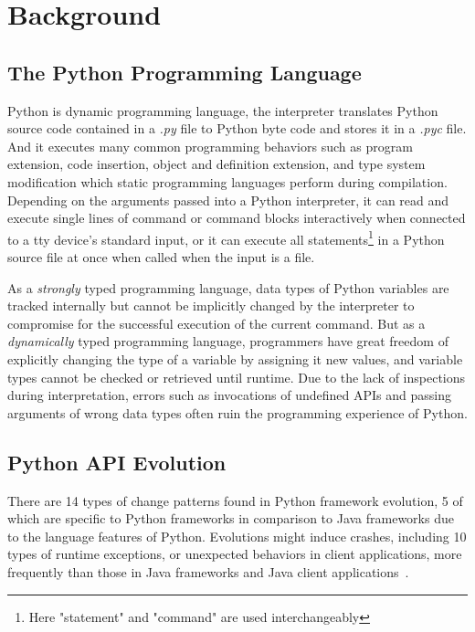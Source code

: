 \chapter{Background}
\label{chap:background}

\section{The Python Programming Language}

Python is dynamic programming language, the interpreter translates Python source code contained in a \textit{.py} file to Python byte code and stores it in a \textit{.pyc} file. And it executes many common programming behaviors such as program extension, code insertion, object and definition extension, and type system modification which static programming languages perform during compilation. Depending on the arguments passed into a Python interpreter, it can read and execute single lines of command or command blocks interactively when connected to a tty device's standard input, or it can execute all statements\footnote{Here "statement" and "command" are used interchangeably} in a Python source file at once when called when the input is a file.

As a \textit{strongly} typed programming language, data types of Python variables are tracked internally but cannot be implicitly changed by the interpreter to compromise for the successful execution of the current command. But as a \textit{dynamically} typed programming language, programmers have great freedom of explicitly changing the type of a variable by assigning it new values, and variable types cannot be checked or retrieved until runtime. Due to the lack of inspections during interpretation, errors such as invocations of undefined APIs and passing arguments of wrong data types often ruin the programming experience of Python.

\section{Python API Evolution}

There are 14 types of change patterns found in Python framework evolution, 5 of which are specific to Python frameworks in comparison to Java frameworks due to the language features of Python. Evolutions might induce crashes, including 10 types of runtime exceptions, or unexpected behaviors in client applications, more frequently than those in Java frameworks and Java client applications~\cite{DBLP:conf/wcre/ZhangZWTLX20}.

